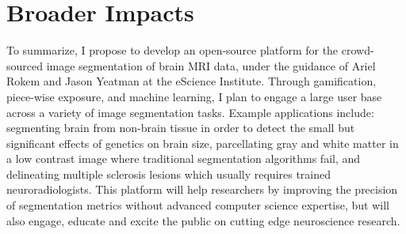 \section*{Broader Impacts}

To summarize, I propose to develop an open-source platform for the crowd-sourced image segmentation of brain MRI data, under the guidance of Ariel Rokem and Jason Yeatman at the eScience Institute. Through gamification, piece-wise exposure, and machine learning, I plan to engage a large user base across a variety of image segmentation tasks. Example applications include: segmenting brain from non-brain tissue in order to detect the small but significant effects of genetics on brain size, parcellating gray and white matter in a low contrast image where traditional segmentation algorithms fail, and delineating multiple sclerosis lesions which usually requires trained neuroradiologists. This platform will help researchers by improving the precision of segmentation metrics without advanced computer science expertise, but will also engage, educate and excite the public on cutting edge neuroscience research. 
